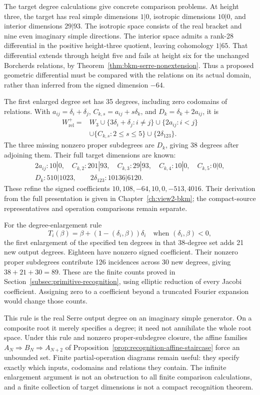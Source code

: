 The target degree calculations give concrete comparison problems.
At height three, the target has real simple dimensions \(1|0\),
isotropic dimensions \(10|0\), and interior dimensions \(29|93\).
The isotropic space consists of the real bracket and nine even
imaginary simple directions.  The interior space admits a
rank-28 differential in the positive height-three quotient, leaving
cohomology \(1|65\).  That differential extends through height
five and fails at height six for the unchanged Borcherds relations,
by Theorem~\ref{thm:bkm-serre-nonextension}.  Thus a proposed
geometric differential must be compared with the relations on its
actual domain, rather than inferred from the signed dimension
\(-64\).

The first enlarged degree set has 35 degrees, including zero
codomains of relations.  With
\(a_{ij}=\delta_i+\delta_j\),
\(C_{k,s}=a_{ij}+s\delta_k\), and
\(D_k=\delta_k+2a_{ij}\), it is
\[
 \begin{split}
 W_{\mathrm{rel}}^+={}&W_3
 \cup\{3\delta_i+\delta_j:i\ne j\}
 \cup\{2a_{ij}:i<j\}\\
 &\cup\{C_{k,s}:2\leq s\leq5\}
 \cup\{2\delta_{123}\}.
 \end{split}
\]
The three missing nonzero proper subdegrees are \(D_k\), giving
38 degrees after adjoining them.  Their full target dimensions are
known:
\[
 \begin{gathered}
 2a_{ij}:10|0,\quad C_{k,2}:201|93,\quad
 C_{k,3}:29|93,\quad C_{k,4}:10|0,\quad C_{k,5}:0|0,\\
 D_k:510|1023,\qquad 2\delta_{123}:10136|6120.
 \end{gathered}
\]
These refine the signed coefficients
\(10,108,-64,10,0,-513,4016\).  Their derivation from the full
presentation is given in Chapter~\ref{ch:view2-bkm}; the
compact-source representatives and operation comparisons remain
separate.

For the degree-enlargement rule
\[
 T_i(\beta)=\beta+(1-(\delta_i,\beta))\delta_i
 \quad\text{when }(\delta_i,\beta)<0,
\]
the first enlargement of the specified ten degrees in that
38-degree set adds 21 new output degrees.  Eighteen have nonzero
signed coefficient.  Their nonzero proper subdegrees contribute
126 incidences across 30 new degrees, giving \(38+21+30=89\).
These are the finite counts proved in
Section~\ref{subsec:primitive-recognition}, using elliptic
reduction of every Jacobi coefficient.  Assigning zero to a
coefficient beyond a truncated Fourier expansion would change
those counts.

This rule is the real Serre output degree on an imaginary simple
generator.  On a composite root it merely specifies a degree;
it need not annihilate the whole root space.  Under this rule and
nonzero proper-subdegree closure, the affine families
\(A_N\Rightarrow B_N\Rightarrow A_{N+2}\) of
Proposition~\ref{prop:recognition-affine-staircase} force an
unbounded set.  Finite partial-operation diagrams remain useful:
they specify exactly which inputs, codomains and relations they
contain.  The infinite enlargement argument is not an obstruction
to all finite comparison calculations, and a finite collection of
target dimensions is not a compact recognition theorem.

